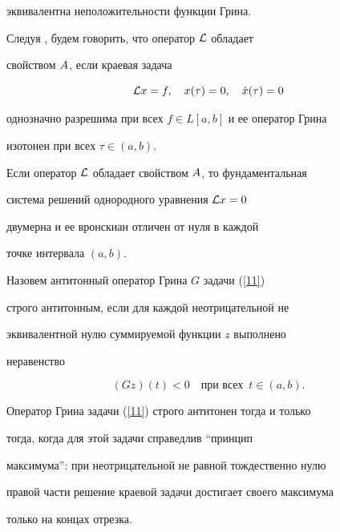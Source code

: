 эквивалентна неположительности функции Грина.





\begin{defns}


Следуя \cite{AAB}, будем говорить, что оператор ${\cal L}$ обладает


свойством $A$, если краевая задача


$$


\L x=f,\quad x(\tau)=0,\quad \Dot x(\tau)=0


$$


однозначно разрешима при всех $f\in L[a,b]$ и ее оператор Грина


изотонен при всех $\tau\in(a,b)$.


\end{defns}





\begin{notes}


Если оператор ${\cal L}$ обладает свойством $A$, то фундаментальная


система решений однородного уравнения ${\cal L} x=0$


двумерна и ее вронскиан отличен от нуля в каждой


точке интервала $(a,b)$.


\end{notes}





\begin{defns}\label{def2}


Назовем антитонный оператор Грина $G$ задачи (\ref{11})


строго антитонным, если для каждой неотрицательной не


эквивалентной нулю суммируемой функции $z$ выполнено


неравенство


$$


(Gz)(t)<0 \quad \text{при всех}\ \;t\in(a,b).


$$


\end{defns}





\begin{notes}


Оператор Грина задачи (\ref{11}) строго антитонен тогда и только


тогда, когда для этой задачи справедлив ``принцип


максимума'': при неотрицательной не равной тождественно нулю


правой части решение краевой задачи достигает своего максимума


только на концах отрезка.


\end{notes}





